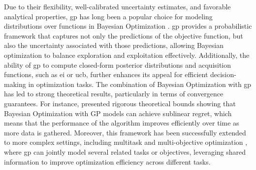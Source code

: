 Due to their flexibility, well-calibrated uncertainty estimates, and favorable analytical properties, \ac{gp} has long been a popular choice for modeling distributions over functions in Bayesian Optimization \citep{osborne2009gaussian}. \ac{gp} provides a probabilistic framework that captures not only the predictions of the objective function, but also the uncertainty associated with those predictions, allowing Bayesian optimization to balance exploration and exploitation effectively. Additionally, the ability of \ac{gp} to compute closed-form posterior distributions and acquisition functions, such as \ac{ei} or \ac{ucb}, further enhances its appeal for efficient decision-making in optimization tasks. The combination of Bayesian Optimization with \ac{gp} has led to strong theoretical results, particularly in terms of convergence guarantees. For instance, \citet{srinivas2009gaussian} presented rigorous theoretical bounds showing that Bayesian Optimization with GP models can achieve sublinear regret, which means that the performance of the algorithm improves efficiently over time as more data is gathered. Moreover, this framework has been successfully extended to more complex settings, including multitask and multi-objective optimization \citep{swersky2013multi}, where \ac{gp} can jointly model several related tasks or objectives, leveraging shared information to improve optimization efficiency across different tasks.

